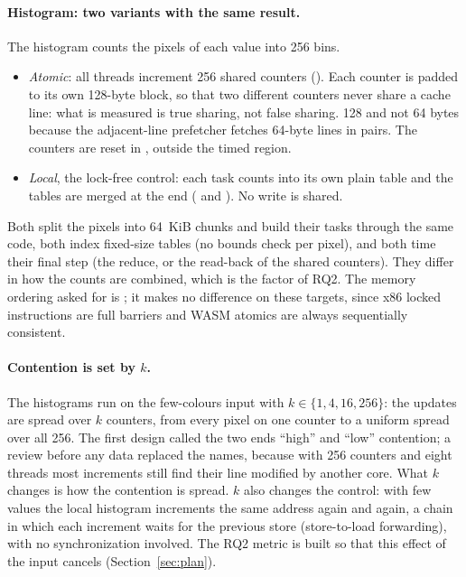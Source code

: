 \paragraph{Histogram: two variants with the same result.} The histogram
counts the pixels of each value into 256 bins.
\begin{itemize}[leftmargin=1.5em]
\item \emph{Atomic}: all threads increment 256 shared 
counters (). Each counter is padded to its own 128-byte
block, so that two different counters never share a cache line: what is
measured is true sharing, not false sharing. 128 and not 64 bytes because
the adjacent-line prefetcher fetches 64-byte lines in pairs. The counters
are reset in , outside the timed region.
\item \emph{Local}, the lock-free control: each task counts into its own
plain table and the tables are merged at the end ( and
). No write is shared.
\end{itemize}
Both split the pixels into 64~KiB chunks and build their tasks through the
same code, both index fixed-size tables (no bounds check per pixel), and
both time their final step (the reduce, or the read-back of the shared
counters). They differ in how the counts are combined, which is the factor
of RQ2. The memory ordering asked for is ; it makes no
difference on these targets, since x86 locked instructions are full
barriers and WASM atomics are always sequentially consistent.

\paragraph{Contention is set by $k$.} The histograms run on the few-colours
input with $k \in \{1, 4, 16, 256\}$: the updates are spread over $k$
counters, from every pixel on one counter to a uniform spread over all 256.
The first design called the two ends ``high'' and ``low'' contention; a
review before any data replaced the names, because with 256 counters and
eight threads most increments still find their line modified by another
core. What $k$ changes is how the contention is spread. $k$ also changes
the control: with few values the local histogram increments the same
address again and again, a chain in which each increment waits for the
previous store (store-to-load forwarding), with no synchronization
involved. The RQ2 metric is built so that this effect of the input cancels
(Section~\ref{sec:plan}).


